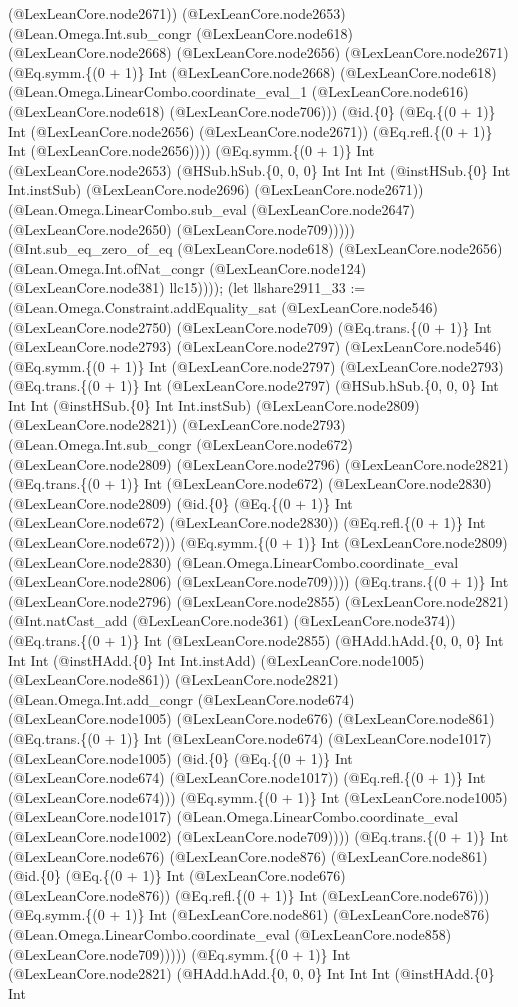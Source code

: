 \documentclass[11pt]{article}
\begin{document}
(@LexLeanCore.node2671)) (@LexLeanCore.node2653) (@Lean.Omega.Int.sub\_congr (@LexLeanCore.node618) (@LexLeanCore.node2668) (@LexLeanCore.node2656) (@LexLeanCore.node2671) (@Eq.symm.\{(0 + 1)\} Int (@LexLeanCore.node2668) (@LexLeanCore.node618) (@Lean.Omega.LinearCombo.coordinate\_eval\_1 (@LexLeanCore.node616) (@LexLeanCore.node618) (@LexLeanCore.node706))) (@id.\{0\} (@Eq.\{(0 + 1)\} Int (@LexLeanCore.node2656) (@LexLeanCore.node2671)) (@Eq.refl.\{(0 + 1)\} Int (@LexLeanCore.node2656)))) (@Eq.symm.\{(0 + 1)\} Int (@LexLeanCore.node2653) (@HSub.hSub.\{0, 0, 0\} Int Int Int (@instHSub.\{0\} Int Int.instSub) (@LexLeanCore.node2696) (@LexLeanCore.node2671)) (@Lean.Omega.LinearCombo.sub\_eval (@LexLeanCore.node2647) (@LexLeanCore.node2650) (@LexLeanCore.node709))))) (@Int.sub\_eq\_zero\_of\_eq (@LexLeanCore.node618) (@LexLeanCore.node2656) (@Lean.Omega.Int.ofNat\_congr (@LexLeanCore.node124) (@LexLeanCore.node381) llc15)))); (let llshare2911\_33 := (@Lean.Omega.Constraint.addEquality\_sat (@LexLeanCore.node546) (@LexLeanCore.node2750) (@LexLeanCore.node709) (@Eq.trans.\{(0 + 1)\} Int (@LexLeanCore.node2793) (@LexLeanCore.node2797) (@LexLeanCore.node546) (@Eq.symm.\{(0 + 1)\} Int (@LexLeanCore.node2797) (@LexLeanCore.node2793) (@Eq.trans.\{(0 + 1)\} Int (@LexLeanCore.node2797) (@HSub.hSub.\{0, 0, 0\} Int Int Int (@instHSub.\{0\} Int Int.instSub) (@LexLeanCore.node2809) (@LexLeanCore.node2821)) (@LexLeanCore.node2793) (@Lean.Omega.Int.sub\_congr (@LexLeanCore.node672) (@LexLeanCore.node2809) (@LexLeanCore.node2796) (@LexLeanCore.node2821) (@Eq.trans.\{(0 + 1)\} Int (@LexLeanCore.node672) (@LexLeanCore.node2830) (@LexLeanCore.node2809) (@id.\{0\} (@Eq.\{(0 + 1)\} Int (@LexLeanCore.node672) (@LexLeanCore.node2830)) (@Eq.refl.\{(0 + 1)\} Int (@LexLeanCore.node672))) (@Eq.symm.\{(0 + 1)\} Int (@LexLeanCore.node2809) (@LexLeanCore.node2830) (@Lean.Omega.LinearCombo.coordinate\_eval (@LexLeanCore.node2806) (@LexLeanCore.node709)))) (@Eq.trans.\{(0 + 1)\} Int (@LexLeanCore.node2796) (@LexLeanCore.node2855) (@LexLeanCore.node2821) (@Int.natCast\_add (@LexLeanCore.node361) (@LexLeanCore.node374)) (@Eq.trans.\{(0 + 1)\} Int (@LexLeanCore.node2855) (@HAdd.hAdd.\{0, 0, 0\} Int Int Int (@instHAdd.\{0\} Int Int.instAdd) (@LexLeanCore.node1005) (@LexLeanCore.node861)) (@LexLeanCore.node2821) (@Lean.Omega.Int.add\_congr (@LexLeanCore.node674) (@LexLeanCore.node1005) (@LexLeanCore.node676) (@LexLeanCore.node861) (@Eq.trans.\{(0 + 1)\} Int (@LexLeanCore.node674) (@LexLeanCore.node1017) (@LexLeanCore.node1005) (@id.\{0\} (@Eq.\{(0 + 1)\} Int (@LexLeanCore.node674) (@LexLeanCore.node1017)) (@Eq.refl.\{(0 + 1)\} Int (@LexLeanCore.node674))) (@Eq.symm.\{(0 + 1)\} Int (@LexLeanCore.node1005) (@LexLeanCore.node1017) (@Lean.Omega.LinearCombo.coordinate\_eval (@LexLeanCore.node1002) (@LexLeanCore.node709)))) (@Eq.trans.\{(0 + 1)\} Int (@LexLeanCore.node676) (@LexLeanCore.node876) (@LexLeanCore.node861) (@id.\{0\} (@Eq.\{(0 + 1)\} Int (@LexLeanCore.node676) (@LexLeanCore.node876)) (@Eq.refl.\{(0 + 1)\} Int (@LexLeanCore.node676))) (@Eq.symm.\{(0 + 1)\} Int (@LexLeanCore.node861) (@LexLeanCore.node876) (@Lean.Omega.LinearCombo.coordinate\_eval (@LexLeanCore.node858) (@LexLeanCore.node709))))) (@Eq.symm.\{(0 + 1)\} Int (@LexLeanCore.node2821) (@HAdd.hAdd.\{0, 0, 0\} Int Int Int (@instHAdd.\{0\} Int 
\end{document}
